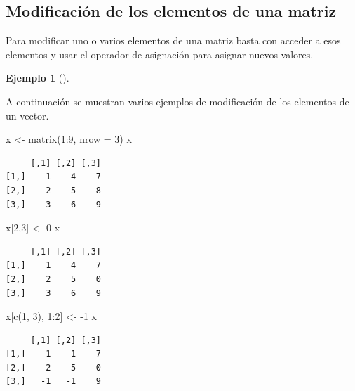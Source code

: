 \documentclass[
  a4paper,
]{scrreport}
\newenvironment{Shaded}{\begin{snugshade}}{\end{snugshade}}
\newcommand{\AttributeTok}[1]{\textcolor[rgb]{0.40,0.45,0.13}{#1}}
\newcommand{\DecValTok}[1]{\textcolor[rgb]{0.68,0.00,0.00}{#1}}
\newcommand{\FunctionTok}[1]{\textcolor[rgb]{0.28,0.35,0.67}{#1}}
\newcommand{\NormalTok}[1]{\textcolor[rgb]{0.00,0.23,0.31}{#1}}
\newcommand{\OtherTok}[1]{\textcolor[rgb]{0.00,0.23,0.31}{#1}}
\newcommand{\SpecialCharTok}[1]{\textcolor[rgb]{0.37,0.37,0.37}{#1}}
\theoremstyle{definition}
\newtheorem{example}{Ejemplo}[chapter]
\theoremstyle{definition}
\theoremstyle{remark}
\begin{document}
\hypertarget{modificaciuxf3n-de-los-elementos-de-una-matriz}{%
\subsection{Modificación de los elementos de una
matriz}\label{modificaciuxf3n-de-los-elementos-de-una-matriz}}

Para modificar uno o varios elementos de una matriz basta con acceder a
esos elementos y usar el operador de asignación para asignar nuevos
valores.

\leavevmode{}%
\begin{example}[]\label{exm-modificacion-matriz}

A continuación se muestran varios ejemplos de modificación de los
elementos de un vector.

\begin{Shaded}
\begin{Highlighting}[]
\NormalTok{x }\OtherTok{\textless{}{-}} \FunctionTok{matrix}\NormalTok{(}\DecValTok{1}\SpecialCharTok{:}\DecValTok{9}\NormalTok{, }\AttributeTok{nrow =} \DecValTok{3}\NormalTok{)}
\NormalTok{x}
\end{Highlighting}
\end{Shaded}

\begin{verbatim}
     [,1] [,2] [,3]
[1,]    1    4    7
[2,]    2    5    8
[3,]    3    6    9
\end{verbatim}

\begin{Shaded}
\begin{Highlighting}[]
\NormalTok{x[}\DecValTok{2}\NormalTok{,}\DecValTok{3}\NormalTok{] }\OtherTok{\textless{}{-}} \DecValTok{0}
\NormalTok{x}
\end{Highlighting}
\end{Shaded}

\begin{verbatim}
     [,1] [,2] [,3]
[1,]    1    4    7
[2,]    2    5    0
[3,]    3    6    9
\end{verbatim}

\begin{Shaded}
\begin{Highlighting}[]
\NormalTok{x[}\FunctionTok{c}\NormalTok{(}\DecValTok{1}\NormalTok{, }\DecValTok{3}\NormalTok{), }\DecValTok{1}\SpecialCharTok{:}\DecValTok{2}\NormalTok{] }\OtherTok{\textless{}{-}} \SpecialCharTok{{-}}\DecValTok{1}
\NormalTok{x}
\end{Highlighting}
\end{Shaded}

\begin{verbatim}
     [,1] [,2] [,3]
[1,]   -1   -1    7
[2,]    2    5    0
[3,]   -1   -1    9
\end{verbatim}

\end{example}
\end{document}
